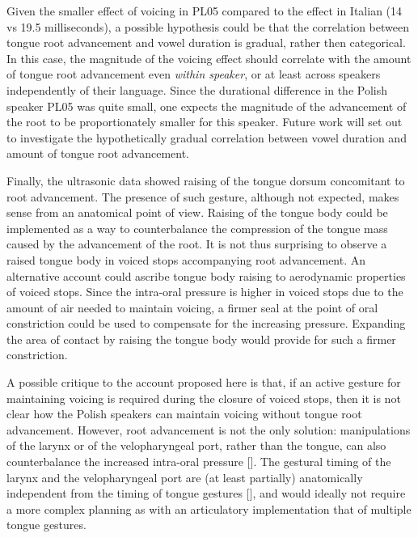 \documentclass[authoryear, twocolumn]{elsarticle}
\begin{document}
Given the smaller effect of voicing in PL05 compared to the effect in
Italian (14 vs 19.5 milliseconds), a possible hypothesis could be that
the correlation between tongue root advancement and vowel duration is
gradual, rather then categorical. In this case, the magnitude of the
voicing effect should correlate with the amount of tongue root
advancement even \emph{within speaker}, or at least across speakers
independently of their language. Since the durational difference in the
Polish speaker PL05 was quite small, one expects the magnitude of the
advancement of the root to be proportionately smaller for this speaker.
Future work will set out to investigate the hypothetically gradual
correlation between vowel duration and amount of tongue root
advancement.

Finally, the ultrasonic data showed raising of the tongue dorsum
concomitant to root advancement. The presence of such gesture, although
not expected, makes sense from an anatomical point of view. Raising of
the tongue body could be implemented as a way to counterbalance the
compression of the tongue mass caused by the advancement of the root. It
is not thus surprising to observe a raised tongue body in voiced stops
accompanying root advancement. An alternative account could ascribe
tongue body raising to aerodynamic properties of voiced stops. Since the
intra-oral pressure is higher in voiced stops due to the amount of air
needed to maintain voicing, a firmer seal at the point of oral
constriction could be used to compensate for the increasing pressure.
Expanding the area of contact by raising the tongue body would provide
for such a firmer constriction.

A possible critique to the account proposed here is that, if an active
gesture for maintaining voicing is required during the closure of voiced
stops, then it is not clear how the Polish speakers can maintain voicing
without tongue root advancement. However, root advancement is not the
only solution: manipulations of the larynx or of the velopharyngeal
port, rather than the tongue, can also counterbalance the increased
intra-oral pressure {[}{]}. The gestural timing of the larynx and the
velopharyngeal port are (at least partially) anatomically independent
from the timing of tongue gestures {[}{]}, and would ideally not require
a more complex planning as with an articulatory implementation that of
multiple tongue gestures.


\end{document}
